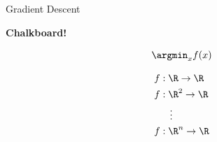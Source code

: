 \begin{frame}{Gradient Descent}

	\begin{center}
		\bfseries
		Chalkboard!

		\begin{equation}
			\argmin_x f(x)
		\end{equation}

		\begin{align*}
			f & : \R \to \R   \\
			f & : \R^2 \to \R \\
			  & \quad \vdots  \\
			f & : \R^n \to \R
		\end{align*}
	\end{center}

\end{frame}

